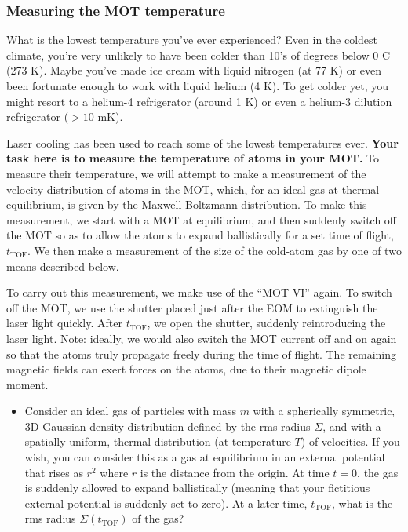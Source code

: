 \documentclass{../lab}
\begin{document}
\subsubsection{Measuring the MOT temperature}
\label{subsubsec:MeasuringMOTTemperature}

What is the lowest temperature you've ever experienced? Even in the coldest climate, you're very unlikely to have been colder than 10's of degrees below 0 C (273 K). Maybe you've made ice cream with liquid nitrogen (at 77 K) or even been fortunate enough to work with liquid helium (4 K). To get colder yet, you might resort to a helium-4 refrigerator (around 1 K) or even a helium-3 dilution refrigerator ($>10$ mK).

Laser cooling has been used to reach some of the lowest temperatures ever. \textbf{Your task here is to measure the temperature of atoms in your MOT.} To measure their temperature, we will attempt to make a measurement of the velocity distribution of atoms in the MOT, which, for an ideal gas at thermal equilibrium, is given by the Maxwell-Boltzmann distribution. To make this measurement, we start with a MOT at equilibrium, and then suddenly switch off the MOT so as to allow the atoms to expand ballistically for a set time of flight, $t_\text{TOF}$. We then make a measurement of the size of the cold-atom gas by one of two means described below.

To carry out this measurement, we make use of the ``MOT VI'' again. To switch off the MOT, we use the shutter placed just after the EOM to extinguish the laser light quickly. After $t_\text{TOF}$, we open the shutter, suddenly reintroducing the laser light. Note: ideally, we would also switch the MOT current off and on again so that the atoms truly propagate freely during the time of flight. The remaining magnetic fields can exert forces on the atoms, due to their magnetic dipole moment.

\begin{itemize}
    \item Consider an ideal gas of particles with mass $m$ with a spherically symmetric, 3D Gaussian density distribution defined by the rms radius $\Sigma$, and with a spatially uniform, thermal distribution (at temperature $T$) of velocities. If you wish, you can consider this as a gas at equilibrium in an external potential that rises as $r^2$ where $r$ is the distance from the origin. At time $t = 0$, the gas is suddenly allowed to expand ballistically (meaning that your fictitious external potential is suddenly set to zero). At a later time, $t_\text{TOF}$, what is the rms radius $\Sigma(t_\text{TOF})$ of the gas?
\end{itemize}
\end{document}
